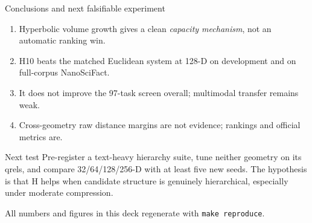 \documentclass[aspectratio=169,10pt]{beamer}
\begin{document}
\begin{frame}{Conclusions and next falsifiable experiment}
\begin{enumerate}
\item Hyperbolic volume growth gives a clean \emph{capacity mechanism}, not an automatic ranking win.
\item H10 beats the matched Euclidean system at 128-D on development and on full-corpus NanoSciFact.
\item It does not improve the 97-task screen overall; multimodal transfer remains weak.
\item Cross-geometry raw distance margins are not evidence; rankings and official metrics are.
\end{enumerate}
\begin{block}{Next test}
Pre-register a text-heavy hierarchy suite, tune neither geometry on its qrels, and compare
32/64/128/256-D with at least five new seeds. The hypothesis is that H helps when candidate
structure is genuinely hierarchical, especially under moderate compression.
\end{block}
\vfill
\centering\small All numbers and figures in this deck regenerate with \texttt{make reproduce}.
\end{frame}
\end{document}

